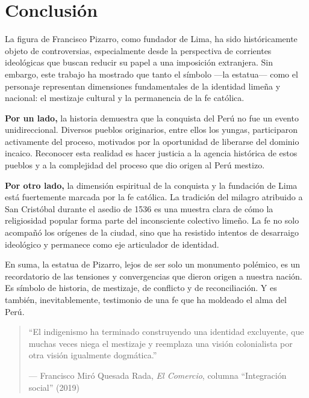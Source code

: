 \documentclass[a4paper,12pt]{article}
\begin{document}
	
	
\section*{Conclusión}

La figura de Francisco Pizarro, como fundador de Lima, ha sido históricamente objeto de controversias, especialmente desde la perspectiva de corrientes ideológicas que buscan reducir su papel a una imposición extranjera. Sin embargo, este trabajo ha mostrado que tanto el símbolo —la estatua— como el personaje representan dimensiones fundamentales de la identidad limeña y nacional: el mestizaje cultural y la permanencia de la fe católica.

\textbf{Por un lado,} la historia demuestra que la conquista del Perú no fue un evento unidireccional. Diversos pueblos originarios, entre ellos los yungas, participaron activamente del proceso, motivados por la oportunidad de liberarse del dominio incaico. Reconocer esta realidad es hacer justicia a la agencia histórica de estos pueblos y a la complejidad del proceso que dio origen al Perú mestizo.

\textbf{Por otro lado,} la dimensión espiritual de la conquista y la fundación de Lima está fuertemente marcada por la fe católica. La tradición del milagro atribuido a San Cristóbal durante el asedio de 1536 es una muestra clara de cómo la religiosidad popular forma parte del inconsciente colectivo limeño. La fe no solo acompañó los orígenes de la ciudad, sino que ha resistido intentos de desarraigo ideológico y permanece como eje articulador de identidad.

En suma, la estatua de Pizarro, lejos de ser solo un monumento polémico, es un recordatorio de las tensiones y convergencias que dieron origen a nuestra nación. Es símbolo de historia, de mestizaje, de conflicto y de reconciliación. Y es también, inevitablemente, testimonio de una fe que ha moldeado el alma del Perú.

\begin{quote}
	“El indigenismo ha terminado construyendo una identidad excluyente, que muchas veces niega el mestizaje y reemplaza una visión colonialista por otra visión igualmente dogmática.”
	\begin{flushright}
		— Francisco Miró Quesada Rada, \textit{El Comercio}, columna “Integración social” (2019)
	\end{flushright}
\end{quote}
\end{document}
